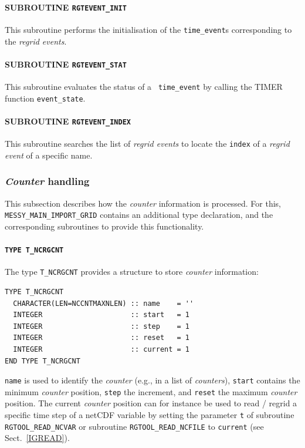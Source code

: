 \documentclass[11pt,twoside]{report}
\begin{document}
\paragraph{SUBROUTINE \color{blue} \tt\bf RGTEVENT\_INIT\\ \label{IGRGTEVINIT}}
This subroutine performs the initialisation of the \verb|time_event|s
corresponding to the {\it regrid events}.%
\paragraph{SUBROUTINE \color{blue} \tt\bf RGTEVENT\_STAT\\ \label{IGRGTEVSTAT}}
This subroutine evaluates the status of a {\tt
time\_event} %
by calling the TIMER function \verb|event_state|.
\paragraph{SUBROUTINE \color{blue} \tt\bf RGTEVENT\_INDEX\\ \label{IGRGTEVINDEX}}
This subroutine searches the list of {\it regrid events} to locate
the \verb|index| of a {\it regrid event} of a specific name.
\subsubsection{{\it Counter} handling\label{IGCNT}}
This subsection describes how the {\it counter} information is processed.
For this, \verb|MESSY_MAIN_IMPORT_GRID|
contains an additional type declaration, and the corresponding subroutines to
provide this functionality.
\paragraph{\color{red} \tt\bf TYPE T\_NCRGCNT\\ \label{IGCNTTYPE}}
The type \verb|T_NCRGCNT| provides a structure to store {\it counter} information:
\begin{verbatim}
TYPE T_NCRGCNT
  CHARACTER(LEN=NCCNTMAXNLEN) :: name    = ''
  INTEGER                     :: start   = 1
  INTEGER                     :: step    = 1
  INTEGER                     :: reset   = 1
  INTEGER                     :: current = 1
END TYPE T_NCRGCNT
\end{verbatim}
\verb|name| is used to identify the {\it counter} (e.g., in a list of {\it counters}), 
\verb|start| contains the minimum {\it counter} position, \verb|step| the increment,
 and \verb|reset| the maximum {\it counter} position. The current {\it counter} position
can for instance be used to read / regrid a
specific time step of a netCDF variable by setting the parameter \verb|t| of
subroutine \verb|RGTOOL_READ_NCVAR| or subroutine
\verb|RGTOOL_READ_NCFILE| to \verb|current| 
(see Sect.~\ref{IGREAD}).
\end{document}
